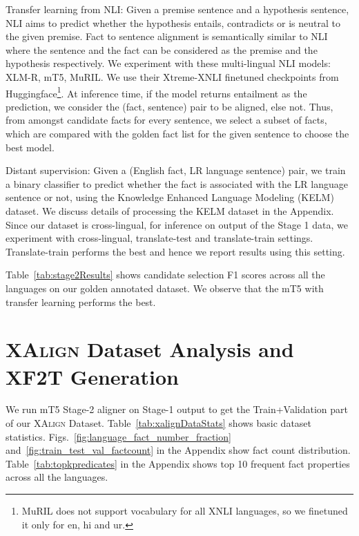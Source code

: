 \documentclass[11pt]{article}
\begin{document}
\noindent Transfer learning from NLI: Given a premise sentence and a hypothesis sentence, NLI aims to predict whether the hypothesis entails, contradicts or is neutral to the given premise. Fact to sentence alignment is semantically similar to NLI where the sentence and the fact can be considered as the premise and the hypothesis respectively. We experiment with these multi-lingual NLI models: XLM-R, mT5, MuRIL. We use their Xtreme-XNLI finetuned checkpoints from Huggingface\footnote{MuRIL does not support vocabulary for all XNLI languages, so we finetuned it only for en, hi and ur.}. At inference time, if the model returns entailment as the prediction, we consider the (fact, sentence) pair to be aligned, else not. Thus, from amongst  candidate facts for every sentence, we select a subset of facts, which are compared with the golden fact list for the given sentence to choose the best model.

\noindent Distant supervision: Given a (English fact, LR language sentence) pair, we train a binary classifier to predict whether the fact is associated with the LR language sentence or not, using the Knowledge Enhanced Language Modeling (KELM)~\cite{agarwal2021knowledge} dataset. We discuss details of processing the KELM dataset in the Appendix. Since our dataset is cross-lingual, for inference on output of the Stage 1 data, we experiment with cross-lingual, translate-test and translate-train settings. Translate-train  performs the best and hence we report results using this setting.

Table~\ref{tab:stage2Results} shows candidate selection F1 scores across all the languages  on our golden annotated dataset. We observe that the mT5 with transfer learning performs the best. 

\section{\textsc{XAlign} Dataset Analysis and XF2T Generation}
\label{sec:approach}
We run mT5 Stage-2 aligner on Stage-1 output to get the Train+Validation part of our \textsc{XAlign} Dataset.  Table~\ref{tab:xalignDataStats} shows basic dataset statistics. Figs.~\ref{fig:language_fact_number_fraction} and~\ref{fig:train_test_val_factcount} in the Appendix show fact count distribution.  Table~\ref{tab:topkpredicates} in the Appendix shows top 10 frequent fact properties across all the languages.
\end{document}
